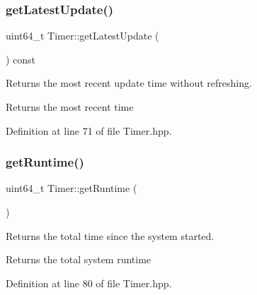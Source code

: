 \subsubsection{\texorpdfstring{getLatestUpdate()}{getLatestUpdate()}}
{\footnotesize\ttfamily uint64\+\_\+t Timer\+::get\+Latest\+Update (\begin{DoxyParamCaption}{ }\end{DoxyParamCaption}) const\hspace{0.3cm}{\ttfamily [inline]}}

Returns the most recent update time without refreshing.

\begin{DoxyReturn}{Returns}
the most recent time 
\end{DoxyReturn}


Definition at line 71 of file Timer.\+hpp.


\begin{DoxyCode}{0}

\end{DoxyCode}
\mbox{\label{classTimer_a8aa7e2c2d1a2321508f6b96a53cddcef}} 
\subsubsection{\texorpdfstring{getRuntime()}{getRuntime()}}
{\footnotesize\ttfamily uint64\+\_\+t Timer\+::get\+Runtime (\begin{DoxyParamCaption}{ }\end{DoxyParamCaption})\hspace{0.3cm}{\ttfamily [inline]}}

Returns the total time since the system started.

\begin{DoxyReturn}{Returns}
the total system runtime 
\end{DoxyReturn}


Definition at line 80 of file Timer.\+hpp.


\begin{DoxyCode}{0}

\end{DoxyCode}
\mbox{\label{classTimer_ad56fbc8001f1dc6a0585290a46af8a92}} 
